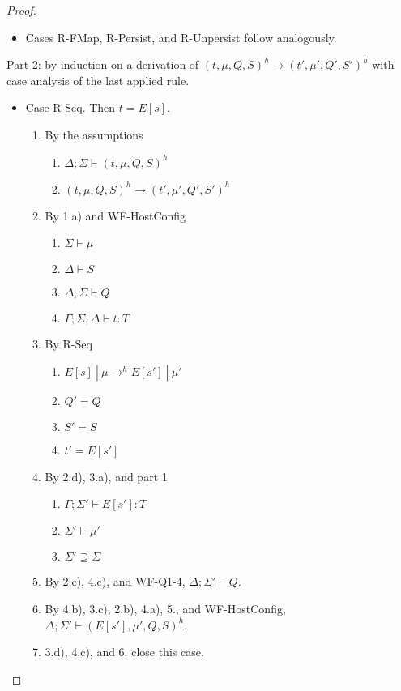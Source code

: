 \documentclass{article}
\theoremstyle{definition}
\begin{document}
\begin{proof}
\begin{itemize}
\item Cases R-FMap, R-Persist, and R-Unpersist follow analogously.
\end{itemize}

Part 2: by induction on a derivation of $(t, \mu, Q, S)^h \longrightarrow (t', \mu', Q', S')^h$ with case analysis of the last applied rule.

\begin{itemize}

\item Case R-Seq. Then $t = E[s]$.
\begin{enumerate}
\item By the assumptions
  \begin{enumerate}[label=(\alph*)]
  \item $\Delta ; \Sigma \vdash (t, \mu, Q, S)^h$
  \item $(t, \mu, Q, S)^h \longrightarrow (t', \mu', Q', S')^h$
  \end{enumerate}
\item By 1.a) and WF-HostConfig
  \begin{enumerate}[label=(\alph*)]
  \item $\Sigma \vdash \mu$
  \item $\Delta \vdash S$
  \item $\Delta ; \Sigma \vdash Q$
  \item $\Gamma ; \Sigma ; \Delta \vdash t : T$
  \end{enumerate}
\item By R-Seq
  \begin{enumerate}[label=(\alph*)]
  \item $E[s]~|~\mu \rightarrow^h E[s']~|~\mu'$
  \item $Q' = Q$
  \item $S' = S$
  \item $t' = E[s']$
  \end{enumerate}
\item By 2.d), 3.a), and part 1
  \begin{enumerate}[label=(\alph*)]
  \item $\Gamma ; \Sigma' \vdash E[s'] : T$
  \item $\Sigma' \vdash \mu'$
  \item $\Sigma' \supseteq \Sigma$
  \end{enumerate}
\item By 2.c), 4.c), and WF-Q1-4, $\Delta ; \Sigma' \vdash Q$.
\item By 4.b), 3.c), 2.b), 4.a), 5., and WF-HostConfig, $\Delta ; \Sigma' \vdash (E[s'], \mu', Q, S)^h$.
\item 3.d), 4.c), and 6. close this case.
\end{enumerate}


\end{itemize}
\end{proof}
\end{document}
